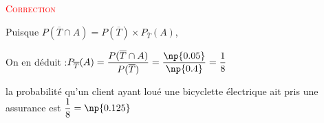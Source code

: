 \begin{enumerate}
			 \textcolor{red}{\textsc{Correction}}


		Puisque \quad \mbox{$P(\overline{T}\cap A)=P(\overline{T})\times P_{\overline{T}}(A)$},

		On en déduit :\quad \mbox{$P_{\overline{T}}(A)=\dfrac{P(\overline{T} \cap A)}{P(\overline{T})} = \dfrac{\np{0.05}}{\np{0.4}}=\dfrac18$}

		la probabilité qu'un client ayant loué une bicyclette électrique ait pris une assurance est \mbox{$\dfrac18=\np{0.125}$}

\end{enumerate}
